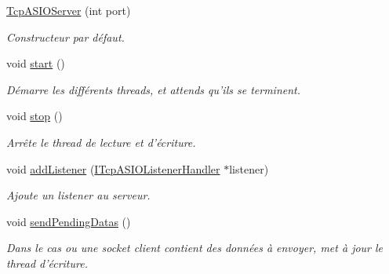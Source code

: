 \begin{DoxyCompactItemize}
\item 
\hyperlink{classmognetwork_1_1_tcp_a_s_i_o_server_a8a201f84e02e478de1de4e0e4d3c029f}{Tcp\-A\-S\-I\-O\-Server} (int port)
\begin{DoxyCompactList}\small\item\em Constructeur par défaut. \end{DoxyCompactList}\item 
\hypertarget{classmognetwork_1_1_tcp_a_s_i_o_server_ad6c804597aafd577c41310cdc986c7ff}{void \hyperlink{classmognetwork_1_1_tcp_a_s_i_o_server_ad6c804597aafd577c41310cdc986c7ff}{start} ()}\label{classmognetwork_1_1_tcp_a_s_i_o_server_ad6c804597aafd577c41310cdc986c7ff}

\begin{DoxyCompactList}\small\item\em Démarre les différents threads, et attends qu'ils se terminent. \end{DoxyCompactList}\item 
\hypertarget{classmognetwork_1_1_tcp_a_s_i_o_server_aa94340baa5fbbfba0f5467c6ddd32b91}{void \hyperlink{classmognetwork_1_1_tcp_a_s_i_o_server_aa94340baa5fbbfba0f5467c6ddd32b91}{stop} ()}\label{classmognetwork_1_1_tcp_a_s_i_o_server_aa94340baa5fbbfba0f5467c6ddd32b91}

\begin{DoxyCompactList}\small\item\em Arrête le thread de lecture et d'écriture. \end{DoxyCompactList}\item 
void \hyperlink{classmognetwork_1_1_tcp_a_s_i_o_server_ac1feafc63d86a8aa90ef6a78acd7051f}{add\-Listener} (\hyperlink{classmognetwork_1_1_i_tcp_a_s_i_o_listener_handler}{I\-Tcp\-A\-S\-I\-O\-Listener\-Handler} $\ast$listener)
\begin{DoxyCompactList}\small\item\em Ajoute un listener au serveur. \end{DoxyCompactList}\item 
\hypertarget{classmognetwork_1_1_tcp_a_s_i_o_server_a6627fca52b19ead79e8a7134bade9e1f}{void \hyperlink{classmognetwork_1_1_tcp_a_s_i_o_server_a6627fca52b19ead79e8a7134bade9e1f}{send\-Pending\-Datas} ()}\label{classmognetwork_1_1_tcp_a_s_i_o_server_a6627fca52b19ead79e8a7134bade9e1f}

\begin{DoxyCompactList}\small\item\em Dans le cas ou une socket client contient des données à envoyer, met à jour le thread d'écriture. \end{DoxyCompactList}\end{DoxyCompactItemize}


